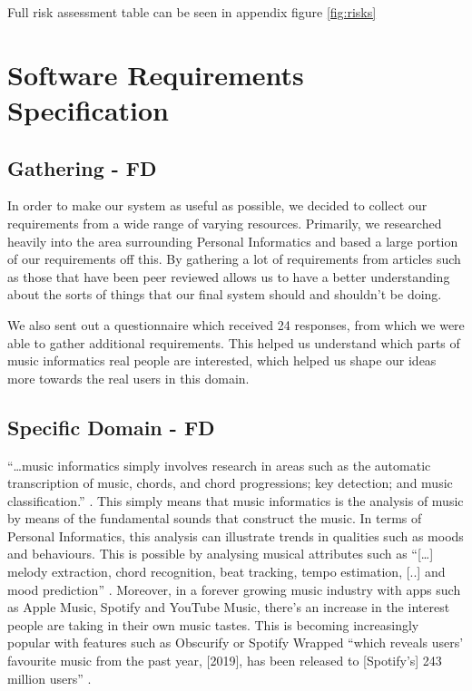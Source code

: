 \documentclass[10pt, notitlepage]{report}
\begin{document}
Full risk assessment table can be seen in appendix figure \ref{fig:risks}

\chapter{Software Requirements Specification}

\section{Gathering - FD}

In order to make our system as useful as possible, we decided to collect our requirements from a wide range of varying resources. Primarily, we researched heavily into the area surrounding Personal Informatics and based a large portion of our requirements off this. By gathering a lot of requirements from articles such as those that have been peer reviewed allows us to have a better understanding about the sorts of things that our final system should and shouldn’t be doing.

We also sent out a questionnaire which received 24 responses, from which we were able to gather additional requirements. This helped us understand which parts of music informatics real people are interested, which helped us shape our ideas more towards the real users in this domain.

\section{Specific Domain -  FD}

“…music informatics simply involves research in areas such as the automatic transcription of music, chords, and chord progressions; key detection; and music classification.” \cite{Paas2013}. This simply means that music informatics is the analysis of music by means of the fundamental sounds that construct the music. In terms of Personal Informatics, this analysis can illustrate trends in qualities such as moods and behaviours. This is possible by analysing musical attributes such as “[…] melody extraction, chord recognition, beat tracking, tempo estimation, [..] and mood prediction” \cite{Humphrey2013}.
Moreover, in a forever growing music industry with apps such as Apple Music, Spotify and YouTube Music, there’s an increase in the interest people are taking in their own music tastes. This is becoming increasingly popular with features such as Obscurify or Spotify Wrapped “which reveals users’ favourite music from the past year, [2019], has been released to [Spotify’s] 243 million users” \cite{Izzard2019}.
\end{document}
